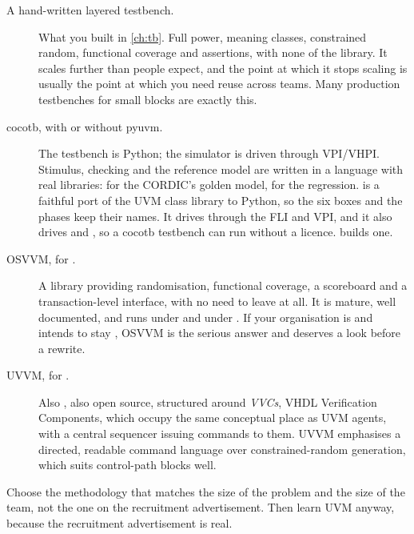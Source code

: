 %
\begin{description}
  \item[A hand-written layered testbench.] What you built in \cref{ch:tb}.
        Full \SV{} power, meaning classes, constrained random, functional
        coverage and assertions, with none of the library. It scales further than people
        expect, and the point at which it stops scaling is usually the point
        at which you need reuse across teams. Many production testbenches for
        small blocks are exactly this.
  \item[cocotb, with or without pyuvm.] The testbench is Python; the
        simulator is driven through VPI/VHPI. Stimulus, checking and the
        reference model are written in a language with real libraries:
         for the CORDIC's golden model,  for the
        regression.  is a faithful port of the UVM class library
        to Python, so the six boxes and the phases keep their names. It drives
         through the FLI and VPI, and it also drives
         and , so a cocotb testbench can
        run without a licence.  builds one.
  \item[OSVVM, for \VHDL{}.] A \VHDL{} library providing randomisation,
        functional coverage, a scoreboard and a transaction-level interface,
        with no need to leave \VHDL{} at all. It is mature, well documented,
        and runs under  and under . If your
        organisation is \VHDL{} and intends to stay \VHDL{}, OSVVM is the
        serious answer and deserves a look before a rewrite.
  \item[UVVM, for \VHDL{}.] Also \VHDL{}, also open source, structured around
        \emph{VVCs}, VHDL Verification Components, which occupy the same
        conceptual place as UVM agents, with a central sequencer issuing
        commands to them. UVVM emphasises a directed, readable command
        language over constrained-random generation, which suits control-path
        blocks well.
\end{description}

\begin{ruleofthumb}
Choose the methodology that matches the size of the problem and the size of
the team, not the one on the recruitment advertisement. Then learn UVM
anyway, because the recruitment advertisement is real.
\end{ruleofthumb}

